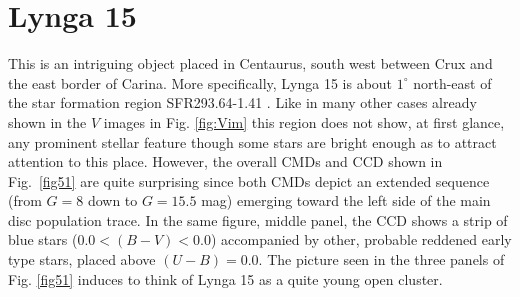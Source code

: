 \documentclass[referee]{aa}
\begin{document}
\section{Lynga 15}

This is an intriguing object placed in Centaurus, south west between Crux and
the east border of Carina. More specifically, Lynga 15 is about $1^\circ$
north-east of the star formation region SFR293.64-1.41 \citep{Avedisova_2002}.
Like in many other cases already shown in the $V$ images in Fig. \ref{fig:Vim}
this region does not show, at first glance, any prominent stellar feature
though some stars are bright enough as to attract attention to this place.
%
However, the overall CMDs and CCD shown in Fig.~\ref{fig51}
are quite surprising since both CMDs depict an extended sequence (from $G=8$
down to $G=15.5$ mag) emerging toward the left side of the main disc population
trace. In the same figure, middle panel, the CCD shows a strip of blue stars
($0.0<(B-V)<0.0$) accompanied by other, probable reddened early type stars,
placed above $(U-B) = 0.0$. The picture seen in the three panels of Fig.
\ref{fig51} induces to think of Lynga 15 as a quite young open cluster.\\
\end{document}
